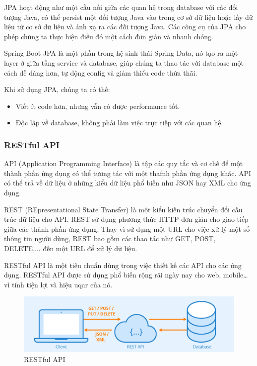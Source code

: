 JPA hoạt động như một cầu nối giữa các quan hệ trong database với các đối tượng Java, có thể persist một đối tượng Java vào trong cơ sở dữ liệu hoặc lấy dữ liệu từ cơ sở dữ liệu và ánh xạ ra các đối tượng Java. Các công cụ của JPA cho phép chúng ta thực hiện điều đó một cách đơn giản và nhanh chóng.\par

Spring Boot JPA là một phần trong hệ sinh thái Spring Data, nó tạo ra một layer ở giữa tầng service và database, giúp chúng ta thao tác với database một cách dễ dàng hơn, tự động config và giảm thiểu code thừa thãi.\par

Khi sử dụng JPA, chúng ta có thế:
\begin{itemize}
    \item Viết ít code hơn, nhưng vẫn có được performance tốt.
    \item Độc lập về database, không phải làm việc trực tiếp với các quan hệ.
\end{itemize}

\subsubsection{RESTful API}
API (Application Programming Interface) là tập các quy tắc và cơ chế để một thành phần ứng dụng có thể tương tác với một thafnh phần ứng dụng khác. API có thể trả về dữ liệu ở những kiểu dữ liệu phổ biến như JSON hay XML cho ứng dụng.\par

REST (REpresentational State Transfer) là một kiểu kiến trúc chuyển đổi cấu trúc dữ liệu cho API. REST sử dụng phương thức HTTP đơn giản cho giao tiếp giữa các thành phần ứng dụng. Thay vì sử dụng một URL cho việc xử lý một số thông tin người dùng, REST bao gồm các thao tác như GET, POST, DELETE,... đến một URL để xử lý dữ liệu.\par

RESTful API là một tiêu chuẩn dùng trong việc thiết kế các API cho các ứng dụng. RESTful API được sử dụng phổ biến rộng rãi ngày nay cho web, mobile… vì tính tiện lợi và hiệu uqar của nó.\par

\begin{figure}[h!]
    \begin{center}
        \includegraphics[width=11.5cm]{Image/Technical/RESTful_API.png}
        \caption{RESTful API}
        \label{RESTfulAPI}
    \end{center}
\end{figure}

